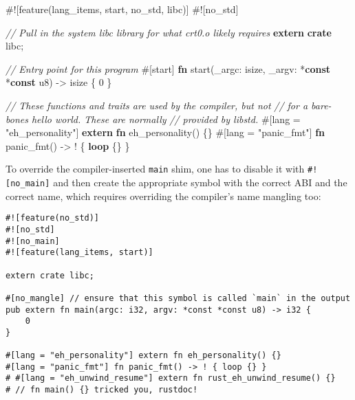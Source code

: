 \documentclass[a4paper,]{book}
\newenvironment{Shaded}{\begin{snugshade}}{\end{snugshade}}
\newcommand{\KeywordTok}[1]{\textcolor[rgb]{0.13,0.29,0.53}{\textbf{{#1}}}}
\newcommand{\DataTypeTok}[1]{\textcolor[rgb]{0.13,0.29,0.53}{{#1}}}
\newcommand{\DecValTok}[1]{\textcolor[rgb]{0.00,0.00,0.81}{{#1}}}
\newcommand{\StringTok}[1]{\textcolor[rgb]{0.31,0.60,0.02}{{#1}}}
\newcommand{\CommentTok}[1]{\textcolor[rgb]{0.56,0.35,0.01}{\textit{{#1}}}}
\newcommand{\AttributeTok}[1]{\textcolor[rgb]{0.77,0.63,0.00}{{#1}}}
\newcommand{\NormalTok}[1]{{#1}}
\begin{document}
\begin{Shaded}
\begin{Highlighting}[]
\AttributeTok{#![}\NormalTok{feature}\AttributeTok{(}\NormalTok{lang_items}\AttributeTok{,} \NormalTok{start}\AttributeTok{,} \NormalTok{no_std}\AttributeTok{,} \NormalTok{libc}\AttributeTok{)]}
\AttributeTok{#![}\NormalTok{no_std}\AttributeTok{]}

\CommentTok{// Pull in the system libc library for what crt0.o likely requires}
\KeywordTok{extern} \KeywordTok{crate} \NormalTok{libc;}

\CommentTok{// Entry point for this program}
\AttributeTok{#[}\NormalTok{start}\AttributeTok{]}
\KeywordTok{fn} \NormalTok{start(_argc: }\DataTypeTok{isize}\NormalTok{, _argv: *}\KeywordTok{const} \NormalTok{*}\KeywordTok{const} \DataTypeTok{u8}\NormalTok{) -> }\DataTypeTok{isize} \NormalTok{\{}
    \DecValTok{0}
\NormalTok{\}}

\CommentTok{// These functions and traits are used by the compiler, but not}
\CommentTok{// for a bare-bones hello world. These are normally}
\CommentTok{// provided by libstd.}
\AttributeTok{#[}\NormalTok{lang }\AttributeTok{=} \StringTok{"eh_personality"}\AttributeTok{]} \KeywordTok{extern} \KeywordTok{fn} \NormalTok{eh_personality() \{\}}
\AttributeTok{#[}\NormalTok{lang }\AttributeTok{=} \StringTok{"panic_fmt"}\AttributeTok{]} \KeywordTok{fn} \NormalTok{panic_fmt() -> ! \{ }\KeywordTok{loop} \NormalTok{\{\} \}}
\end{Highlighting}
\end{Shaded}

To override the compiler-inserted \texttt{main} shim, one has to disable
it with \texttt{\#!{[}no\_main{]}} and then create the appropriate
symbol with the correct ABI and the correct name, which requires
overriding the compiler's name mangling too:

\begin{verbatim}
#![feature(no_std)]
#![no_std]
#![no_main]
#![feature(lang_items, start)]

extern crate libc;

#[no_mangle] // ensure that this symbol is called `main` in the output
pub extern fn main(argc: i32, argv: *const *const u8) -> i32 {
    0
}

#[lang = "eh_personality"] extern fn eh_personality() {}
#[lang = "panic_fmt"] fn panic_fmt() -> ! { loop {} }
# #[lang = "eh_unwind_resume"] extern fn rust_eh_unwind_resume() {}
# // fn main() {} tricked you, rustdoc!
\end{verbatim}
\end{document}
